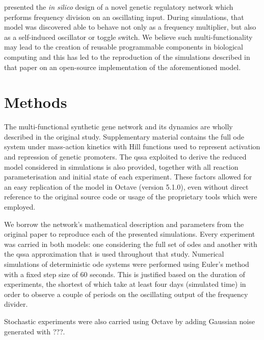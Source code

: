   \citet{originals} presented the \textit{in silico} design of a novel genetic regulatory network which performs frequency division on an oscillating input.
  During simulations, that model was discovered able to behave not only as a frequency multiplier, but also as a self-induced oscillator or toggle switch.
  We believe such multi-functionality may lead to the creation of reusable programmable components in biological computing and this has led to the reproduction of the simulations described in that paper on an open-source implementation of the aforementioned model.


\section{Methods}

  The multi-functional synthetic gene network and its dynamics are wholly described in the original study.
  Supplementary material contains the full \ac{ode} system under mass-action kinetics with Hill functions used to represent activation and repression of genetic promoters.
  The \ac{qssa} exploited to derive the reduced model considered in simulations is also provided, together with all reaction parameterisation and initial state of each experiment.
  These factors allowed for an easy replication of the model in Octave (version 5.1.0), even without direct reference to the original source code or usage of the proprietary tools which were employed.

  We borrow the network's mathematical description and parameters from the original paper to reproduce each of the presented simulations.
  Every experiment was carried in both models: one considering the full set of \acs{odes} and another with the \ac{qssa} approximation that is used throughout that study.
  Numerical simulations of deterministic \ac{ode} systems were performed using Euler's method with a fixed step size of 60 seconds.
  This is justified based on the duration of experiments, the shortest of which take at least four days (simulated time) in order to observe a couple of periods on the oscillating output of the frequency divider.


  Stochastic experiments were also carried using Octave by adding Gaussian noise generated with ???.


